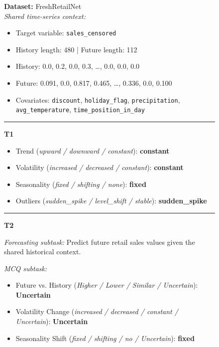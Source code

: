 \begin{figure}[htbp]
\centering
\begin{tcolorbox}[
  colback=gray!6,
  colframe=black!20,
  boxrule=0.5pt,
  arc=3pt,
  left=6pt,right=6pt,top=6pt,bottom=6pt
]
\textbf{Dataset:} FreshRetailNet \\

\emph{Shared time-series context:}
\begin{itemize}[leftmargin=1.1em,itemsep=0pt,topsep=0pt,parsep=0pt,partopsep=0pt]
  \item Target variable: \texttt{sales\_censored}
  \item History length: 480 \quad | \quad Future length: 112
  \item History: 0.0, 0.2, 0.0, 0.3, \ldots, 0.0, 0.0, 0.0
  \item Future: 0.091, 0.0, 0.817, 0.465, \ldots, 0.336, 0.0, 0.100
  \item Covariates:
  \texttt{discount}, \texttt{holiday\_flag}, \texttt{precipitation},
  \texttt{avg\_temperature}, \texttt{time\_position\_in\_day}
\end{itemize}

\hrule\vspace{4pt}

\textbf{T1}
\begin{itemize}[leftmargin=1.1em,itemsep=0pt,topsep=0pt,parsep=0pt,partopsep=0pt]
  \item Trend (\textit{upward / downward / constant}): \textbf{constant}
  \item Volatility (\textit{increased / decreased / constant}): \textbf{constant}
  \item Seasonality (\textit{fixed / shifting / none}): \textbf{fixed}
  \item Outliers (\textit{sudden\_spike / level\_shift / stable}): \textbf{sudden\_spike}
\end{itemize}

\vspace{3pt}\hrule\vspace{4pt}

\textbf{T2}

\emph{Forecasting subtask:}
Predict future retail sales values given the shared historical context.

\emph{MCQ subtask:}
\begin{itemize}[leftmargin=1.1em,itemsep=0pt,topsep=0pt,parsep=0pt,partopsep=0pt]
  \item Future vs. History
  (\textit{Higher / Lower / Similar / Uncertain}): \textbf{Uncertain}
  \item Volatility Change
  (\textit{increased / decreased / constant / Uncertain}): \textbf{Uncertain}
  \item Seasonality Shift
  (\textit{fixed / shifting / no / Uncertain}): \textbf{fixed}
\end{itemize}


\end{tcolorbox}
\end{figure}
